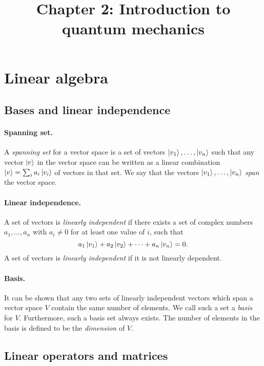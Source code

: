 \documentclass{article}
\begin{document}
\title{Chapter 2: Introduction to quantum mechanics}
\maketitle

\section{Linear algebra}

\subsection{Bases and linear independence}

\paragraph{Spanning set.} A \emph{spanning set} for a vector space is a set of vectors $\ket{v_1}, \ldots, \ket{v_n}$ such that any vector $\ket{v}$ in the vector space can be written as a linear combination $\ket{v} = \sum_i a_i \ket{v_i}$ of vectors in that set. We say that the vectors $\ket{v_1}, \ldots, \ket{v_n}$ \emph{span} the vector space.

\paragraph{Linear independence.} A set of vectors is \emph{linearly independent} if there exists a set of complex numbers $a_1, \ldots, a_n$ with $a_i \neq 0$ for at least one value of $i$, such that \begin{equation} \label{eq:lin-ind}
  a_1\ket{v_1} + a_2\ket{v_2} + \cdots + a_n\ket{v_n} = 0.
\end{equation}
A set of vectors is \emph{linearly independent} if it is not linearly dependent.

\paragraph{Basis.} It can be shown that any two sets of linearly independent vectors which span a vector space $V$ contain the same number of elements. We call such a set a \emph{basis} for $V$. Furthermore, such a basis set always exists. The number of elements in the basis is defined to be the \emph{dimension} of $V$.

\subsection{Linear operators and matrices}
\end{document}
